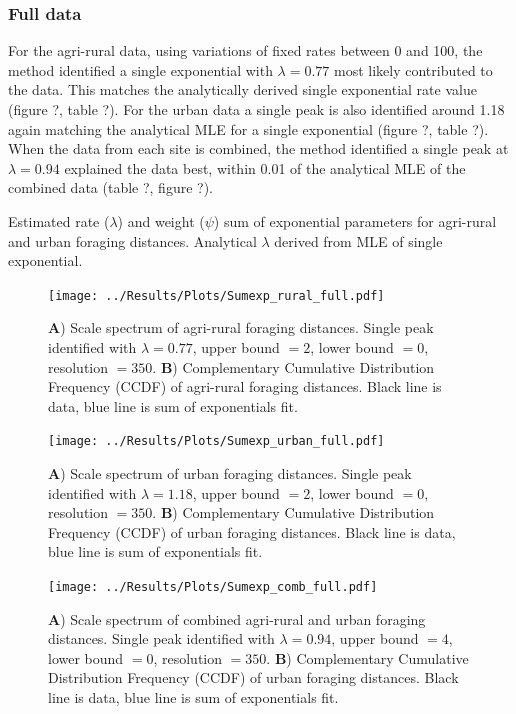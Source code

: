 \documentclass[11pt,usenames,dvipsnames]{article}
\begin{document}
\subsubsection{Full data}
\begin{linenumbers}
\hspace{\parindent}
For the agri-rural data, using variations of fixed rates between 0 and 100, the method identified a single exponential with $\lambda = 0.77$ most likely contributed to the data. This matches the analytically derived single exponential rate value (figure ?, table ?). For the urban data a single peak is also identified around 1.18 again matching the analytical MLE for a single exponential (figure ?, table ?). When the data from each site is combined, the method identified a single peak at $\lambda = 0.94$ explained the data best, within 0.01 of the analytical MLE of the combined data (table ?, figure ?). 
\end{linenumbers}

\begin{table}[H]
	\centering
	\caption{Estimated rate ($\lambda$) and weight ($\psi$) sum of exponential parameters for agri-rural and urban foraging distances. Analytical $\lambda$ derived from MLE of single exponential.}
	
\end{table}


\begin{figure}[H]
	\centering
	\texttt{[image: ../Results/Plots/Sumexp\_rural\_full.pdf]}
	\caption{\textbf{A}) Scale spectrum of agri-rural foraging distances. Single peak identified with $\lambda = 0.77$, upper bound $= 2$, lower bound $= 0$, resolution $= 350$. \textbf{B}) Complementary Cumulative Distribution Frequency (CCDF) of agri-rural foraging distances. Black line is data, blue line is sum of exponentials fit.}
\end{figure}

\begin{figure}[H]
	\centering
	\texttt{[image: ../Results/Plots/Sumexp\_urban\_full.pdf]}
	\caption{\textbf{A}) Scale spectrum of urban foraging distances. Single peak identified with $\lambda = 1.18$, upper bound $= 2$, lower bound $= 0$, resolution $= 350$. \textbf{B}) Complementary Cumulative Distribution Frequency (CCDF) of urban foraging distances. Black line is data, blue line is sum of exponentials fit.}
\end{figure}

\begin{figure}[H]
	\centering
	\texttt{[image: ../Results/Plots/Sumexp\_comb\_full.pdf]}
	\caption{\textbf{A}) Scale spectrum of combined agri-rural and urban foraging distances. Single peak identified with $\lambda = 0.94$, upper bound $= 4$, lower bound $= 0$, resolution $= 350$. \textbf{B}) Complementary Cumulative Distribution Frequency (CCDF) of urban foraging distances. Black line is data, blue line is sum of exponentials fit.}
\end{figure}
\end{document}
